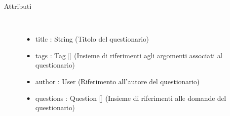 \begin{description}
\item[Attributi] \hfill \\
 \vspace{-7mm}
\begin{itemize}
\item title : String (Titolo del questionario)
\item tags : Tag [] (Insieme di riferimenti agli argomenti associati al questionario)
\item author : User (Riferimento all'autore del questionario)
\item questions : Question [] (Insieme di riferimenti alle domande del questionario)
\end{itemize}

\end{description}

\vspace{0.5cm}
\hypertarget{server::data::Question}{}
